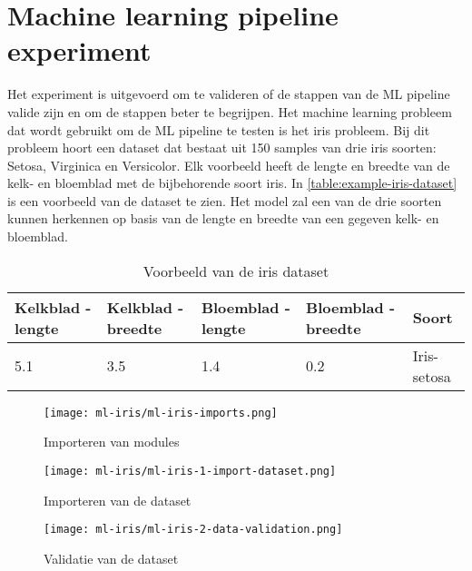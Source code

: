 \section{Machine learning pipeline experiment}\label{appendix:ml-pipeline-experiment}
Het experiment is uitgevoerd om te valideren of de stappen van de ML pipeline valide zijn en om de stappen beter te begrijpen. Het machine learning probleem dat wordt gebruikt om de ML pipeline te testen is het iris probleem. Bij dit probleem hoort een dataset dat bestaat uit 150 samples van drie iris soorten: Setosa, Virginica en Versicolor. Elk voorbeeld heeft de lengte en breedte van de kelk- en bloemblad met de bijbehorende soort iris. In \autoref{table:example-iris-dataset} is een voorbeeld van de dataset te zien. Het model zal een van de drie soorten kunnen herkennen op basis van de lengte en breedte van een gegeven kelk- en bloemblad. 

\begin{table}[hbt!]
  \footnotesize
  \centering
  \begin{tabular}{|l|l|l|l|l|}
  \hline
  \textbf{Kelkblad - lengte} & \textbf{Kelkblad - breedte} & \textbf{Bloemblad - lengte} & \textbf{Bloemblad - breedte} & \textbf{Soort} \\ \hline
  5.1 & 3.5 & 1.4 & 0.2 & Iris-setosa\\ \hline
  \end{tabular}
  \caption{Voorbeeld van de iris dataset}
  \label{table:example-iris-dataset}
\end{table}

\begin{figure}[hbt!]
  \centering
  \texttt{[image: ml-iris/ml-iris-imports.png]}
  \caption{Importeren van modules}
  \label{fig:appendix:ml-iris-imports}
\end{figure}

\begin{figure}[hbt!]
  \centering
  \texttt{[image: ml-iris/ml-iris-1-import-dataset.png]}
  \caption{Importeren van de dataset}
  \label{fig:appendix:ml-iris-1-import-dataset}
\end{figure}

\clearpage

\begin{figure}[hbt!]
  \centering
  \texttt{[image: ml-iris/ml-iris-2-data-validation.png]}
  \caption{Validatie van de dataset}
  \label{fig:appendix:ml-iris-2-data-validation}
\end{figure}

